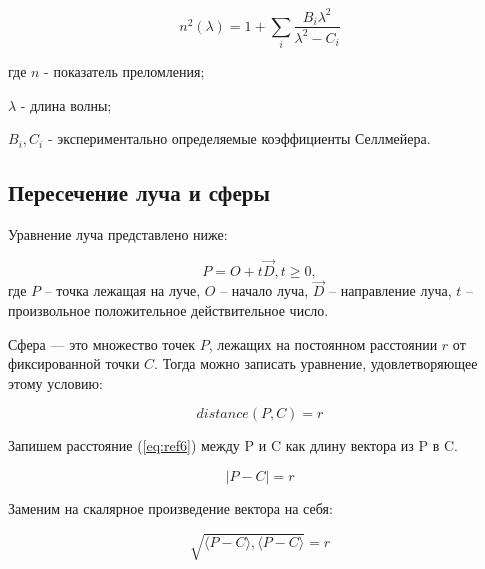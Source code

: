             \begin{equation}
                n^2(\lambda) = 1 + \sum_{i}^{} \frac{B_i \lambda^2}{\lambda^2 - C_i}  \label{eq:zel}
            \end{equation}
            
            где \( n \) - показатель преломления;
            
            \( \lambda \) - длина волны;
            
            \( B_i, C_i \) - экспериментально определяемые коэффициенты Селлмейера.
    
        \subsection{Пересечение луча и сферы}
        
            Уравнение луча представлено ниже:

            \begin{equation}
            	P = O + t\overrightarrow{D}, t \geq 0,
            	\label{eq:ref5}
            \end{equation}
            где \( P \) -- точка лежащая на луче, \( O \) -- начало луча, $\overrightarrow{D}$ -- направление луча, \( t \) -- произвольное положительное действительное число.
            
            Сфера — это множество точек $P$, лежащих на постоянном расстоянии $r$ от фиксированной точки $C$. Тогда можно записать уравнение, удовлетворяющее этому условию:
            
            \begin{equation}
            	distance(P,C) = r
            	\label{eq:ref6}
            \end{equation}
            
            Запишем расстояние (\ref{eq:ref6}) между P и C как длину вектора из P в C.
            
            \begin{equation}
            	|P-C|=r
            \end{equation}
            
            Заменим на скалярное произведение вектора на себя:
            
            \begin{equation}
            	\sqrt{\langle P - C\rangle, \langle P - C\rangle} = r
            \end{equation}
            
